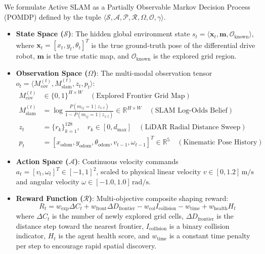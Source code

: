 \documentclass[11pt,a4paper]{article}
\begin{document}
We formulate Active SLAM as a Partially Observable Markov Decision Process (POMDP) defined by the tuple $\langle \mathcal{S}, \mathcal{A}, \mathcal{P}, \mathcal{R}, \Omega, \mathcal{O}, \gamma \rangle$.

\begin{itemize}
    \item \textbf{State Space ($\mathcal{S}$)}: The hidden global environment state $s_t = \langle \mathbf{x}_t, \mathbf{m}, \mathcal{O}_{\text{known}} \rangle$, where $\mathbf{x}_t = [x_t, y_t, \theta_t]^T$ is the true ground-truth pose of the differential drive robot, $\mathbf{m}$ is the true static map, and $\mathcal{O}_{\text{known}}$ is the explored grid region.
    
    \item \textbf{Observation Space ($\Omega$)}: The multi-modal observation tensor $o_t = \langle M_{\text{cov}}^{(t)}, M_{\text{slam}}^{(t)}, z_t, p_t \rangle$:
    \begin{align}
        M_{\text{cov}}^{(t)} &\in \{0, 1\}^{H \times W} \quad (\text{Explored Frontier Grid Map}) \\
        M_{\text{slam}}^{(t)} &= \log \frac{P(m_{ij}=1 \mid z_{1:t})}{1 - P(m_{ij}=1 \mid z_{1:t})} \in \mathbb{R}^{H \times W} \quad (\text{SLAM Log-Odds Belief}) \\
        z_t &= \{r_k\}_{k=1}^{128}, \quad r_k \in [0, d_{\max}] \quad (\text{LiDAR Radial Distance Sweep}) \\
        p_t &= [x_{\text{odom}}, y_{\text{odom}}, \theta_{\text{odom}}, v_{t-1}, \omega_{t-1}]^T \in \mathbb{R}^5 \quad (\text{Kinematic Pose History})
    \end{align}

    \item \textbf{Action Space ($\mathcal{A}$)}: Continuous velocity commands $a_t = [v_t, \omega_t]^T \in [-1, 1]^2$, scaled to physical linear velocity $v \in [0, 1.2]\,\text{m/s}$ and angular velocity $\omega \in [-1.0, 1.0]\,\text{rad/s}$.

    \item \textbf{Reward Function ($\mathcal{R}$)}: Multi-objective composite shaping reward:
    \begin{equation}
        R_t = w_{\text{exp}} \Delta C_t + w_{\text{front}} \Delta D_{\text{frontier}} - w_{\text{col}} I_{\text{collision}} - w_{\text{time}} + w_{\text{health}} H_t
    \end{equation}
    where $\Delta C_t$ is the number of newly explored grid cells, $\Delta D_{\text{frontier}}$ is the distance step toward the nearest frontier, $I_{\text{collision}}$ is a binary collision indicator, $H_t$ is the agent health score, and $w_{\text{time}}$ is a constant time penalty per step to encourage rapid spatial discovery.
\end{itemize}
\end{document}
